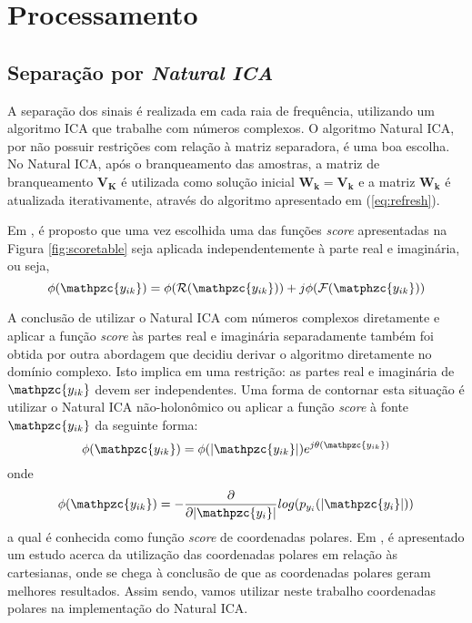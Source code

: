 \section{Processamento}

    \subsection{Separação por \textit{Natural ICA}}
    
        A separação dos sinais é realizada em cada raia de frequência, utilizando um algoritmo ICA que trabalhe com números complexos. O algoritmo Natural ICA, por não possuir restrições com relação à matriz separadora, é uma boa escolha. No Natural ICA, após o branqueamento das amostras, a matriz de branqueamento $\mathbf{V_K}$ é utilizada como solução inicial $\mathbf{W_k = V_k}$ e a matriz $\mathbf{W_k}$ é atualizada iterativamente, através do algoritmo apresentado em (\ref{eq:refresh}).
    
        Em \cite{real}, é proposto que uma vez escolhida uma das funções \textit{score} apresentadas na Figura \ref{fig:scoretable} seja aplicada independentemente à parte real e imaginária, ou seja,
        \begin{equation}
            \phi(\mathpzc{y_{ik}}) =\phi(\mathcal{R}(\mathpzc{y_{ik}})) + j\phi(\mathcal{F}(\matphzc{y_{ik}}))
        \end{equation}
    
        A conclusão de utilizar o Natural ICA com números complexos diretamente e aplicar a função \textit{score} às partes real e imaginária separadamente também foi obtida por outra abordagem que decidiu derivar o algoritmo diretamente no domínio complexo. Isto implica em uma restrição: as partes real e imaginária de $\mathpzc{y_{ik}}$ devem ser independentes. Uma forma de contornar esta situação é utilizar o Natural ICA não-holonômico ou aplicar a função \textit{score} à fonte $\mathpzc{y_{ik}}$ da seguinte forma:
        \begin{equation}
               \phi(\mathpzc{y_{ik}}) =\phi(|\mathpzc{y_{ik}}|)e^{j\theta(\mathpzc{y_{ik}})}
        \end{equation}
        onde 
        \begin{equation}
            \phi(\mathpzc{y_{ik}}) = - \frac{\partial}{\partial |\mathpzc{y_i}| }log(p_{y_i}(|\mathpzc{y_i}|))
        \end{equation}
        a qual é conhecida como função \textit{score} de coordenadas polares. Em \cite{LuizVictorio}, é apresentado um estudo acerca da utilização das coordenadas polares em relação às cartesianas, onde se chega à conclusão de que as coordenadas polares geram melhores resultados. Assim sendo, vamos utilizar neste trabalho coordenadas polares na implementação do Natural ICA.
        

